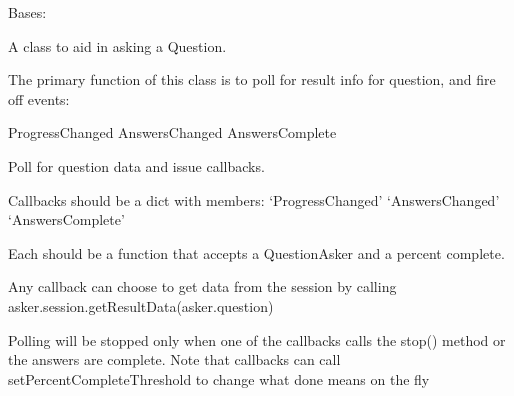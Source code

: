 \documentclass[letterpaper,10pt,english]{sphinxmanual}
\begin{document}
\begin{fulllineitems}
\label{taniumpy.question_asker:taniumpy.question_asker.QuestionAsker}
Bases: \href{http://docs.python.org/2.7/library/functions.html\#object}{}

A class to aid in asking a Question.

The primary function of this class is to poll for
result info for question, and fire off events:

ProgressChanged
AnswersChanged
AnswersComplete

\begin{fulllineitems}
\label{taniumpy.question_asker:taniumpy.question_asker.QuestionAsker.POLLING_INTERVAL}
\end{fulllineitems}


\begin{fulllineitems}
\label{taniumpy.question_asker:taniumpy.question_asker.QuestionAsker.run}
Poll for question data and issue callbacks.

Callbacks should be a dict with members:
`ProgressChanged'
`AnswersChanged'
`AnswersComplete'

Each should be a function that accepts a QuestionAsker
and a percent complete.

Any callback can choose to get data from the session
by calling asker.session.getResultData(asker.question)

Polling will be stopped only when one of the callbacks
calls the stop() method or the answers are complete. Note
that callbacks can call setPercentCompleteThreshold to
change what done means on the fly

\end{fulllineitems}


\begin{fulllineitems}
\label{taniumpy.question_asker:taniumpy.question_asker.QuestionAsker.setPctCompleteThreshold}
\end{fulllineitems}


\begin{fulllineitems}
\label{taniumpy.question_asker:taniumpy.question_asker.QuestionAsker.stop}
\end{fulllineitems}


\end{fulllineitems}
\end{document}
